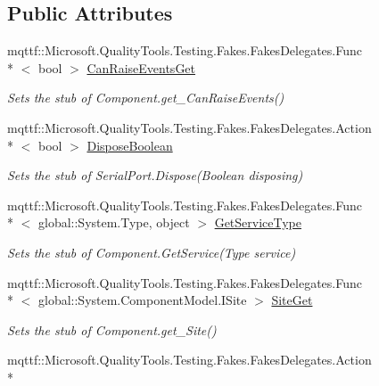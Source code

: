 \subsection*{Public Attributes}
\begin{DoxyCompactItemize}
\item 
mqttf\-::\-Microsoft.\-Quality\-Tools.\-Testing.\-Fakes.\-Fakes\-Delegates.\-Func\\*
$<$ bool $>$ \hyperlink{class_system_1_1_i_o_1_1_ports_1_1_fakes_1_1_stub_serial_port_a4057f69832337c159a91578eeae9ffa5}{Can\-Raise\-Events\-Get}
\begin{DoxyCompactList}\small\item\em Sets the stub of Component.\-get\-\_\-\-Can\-Raise\-Events()\end{DoxyCompactList}\item 
mqttf\-::\-Microsoft.\-Quality\-Tools.\-Testing.\-Fakes.\-Fakes\-Delegates.\-Action\\*
$<$ bool $>$ \hyperlink{class_system_1_1_i_o_1_1_ports_1_1_fakes_1_1_stub_serial_port_af192542f588eacbad768ea6fd5d280e0}{Dispose\-Boolean}
\begin{DoxyCompactList}\small\item\em Sets the stub of Serial\-Port.\-Dispose(\-Boolean disposing)\end{DoxyCompactList}\item 
mqttf\-::\-Microsoft.\-Quality\-Tools.\-Testing.\-Fakes.\-Fakes\-Delegates.\-Func\\*
$<$ global\-::\-System.\-Type, object $>$ \hyperlink{class_system_1_1_i_o_1_1_ports_1_1_fakes_1_1_stub_serial_port_a06a81b245f804a49fc4ad1265a7a69f6}{Get\-Service\-Type}
\begin{DoxyCompactList}\small\item\em Sets the stub of Component.\-Get\-Service(\-Type service)\end{DoxyCompactList}\item 
mqttf\-::\-Microsoft.\-Quality\-Tools.\-Testing.\-Fakes.\-Fakes\-Delegates.\-Func\\*
$<$ global\-::\-System.\-Component\-Model.\-I\-Site $>$ \hyperlink{class_system_1_1_i_o_1_1_ports_1_1_fakes_1_1_stub_serial_port_a0b6a764a2ad88d092e33cb38485e76fb}{Site\-Get}
\begin{DoxyCompactList}\small\item\em Sets the stub of Component.\-get\-\_\-\-Site()\end{DoxyCompactList}\item 
mqttf\-::\-Microsoft.\-Quality\-Tools.\-Testing.\-Fakes.\-Fakes\-Delegates.\-Action\\*

\end{DoxyCompactItemize}

